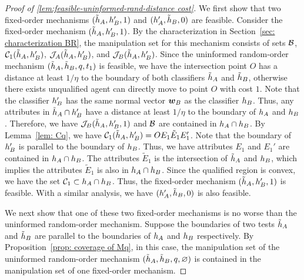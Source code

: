 \begin{proof}[Proof of \cref{lem:feasible-uninformed-rand-distance cost}]

We first show that two fixed-order mechanisms $(\tilde{h}_A,h_B',1)$ and $(h_A',\tilde{h}_B,0)$ are feasible.
Consider the fixed-order mechanism $(\tilde{h}_A,h_B',1)$.
By the characterization in Section~\ref{sec: characterization BR}, the manipulation set for this mechanism consists of sets $\mathcal{B}$, $\mathcal{C}_1(\tilde{h}_A,h_B')$, $\mathcal{J}_A(\tilde{h}_A,h_B')$, and $\mathcal{J}_B(\tilde{h}_A,h_B')$.
Since the uninformed random-order mechanism $(\tilde{h}_A,\tilde{h}_B,q,t_1)$ is feasible, we have the intersection point $O$ has a distance at least $1/\eta$ to the boundary of both classifiers $\tilde{h}_A$ and $\tilde{h}_B$, otherwise there exists unqualified agent can directly move to point $O$ with cost $1$.
Note that the classifier $h_B'$ has the same normal vector $\boldsymbol{w}_B$ as the classifier $h_B$. 
Thus, any attributes in $\tilde {h}_A \cap h_B'$ have a distance at least $1/\eta$ to the boundary of $h_A$ and $h_B$.
Therefore, we have $\mathcal{J}_B(\tilde {h}_A, h_B', 1)$ and $\mathcal{B}$ are contained in $h_A \cap h_B$.
By Lemma~\ref{lem: Cq}, we have $\mathcal{C}_1(\tilde {h}_A, h_B') = OE_1\tilde E_1 E_1'$.
Note that the boundary of $h_B'$ is parallel to the boundary of $h_B$.
Thus, we have attributes $E_1$ and $E_1'$ are
contained in $h_A \cap h_B$.
The attributes $\tilde E_1$ is the intersection of $\tilde{h}_A$ and $h_B$, which implies the attributes $\tilde E_1$ is also in $h_A \cap h_B$.
Since the qualified region is convex, we have the set $\mathcal{C}_1 \subset h_A \cap h_B$.
Thus, the fixed-order mechanism $(\tilde{h}_A,h_B',1)$ is feasible. 
With a similar analysis, we have $(h_A', \tilde{h}_B, 0)$ is also feasible. 

We next show that one of these two fixed-order mechanisms is no worse than the uninformed random-order mechanism. 
Suppose the boundaries of two tests $\tilde {h}_A$ and $\tilde {h}_B$ are parallel to the boundaries of $h_A$ and $h_B$ respectively. 
By Proposition~\ref{prop: coverage of Mq}, in this case, the manipulation set of the uninformed random-order mechanism $(\tilde{h}_A,\tilde{h}_B,q,\varnothing)$ is contained in the manipulation set of one fixed-order mechanism.


\end{proof}
